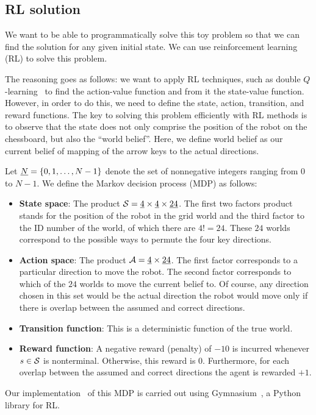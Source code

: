 \subsection{RL solution}
\label{ssec:rl_sol}
%
We want to be able to programmatically solve this toy problem so that we can 
find the solution for any given initial state. We can use reinforcement learning
(RL) to solve this problem. 

The reasoning goes as follows: we want to apply RL techniques, such as double
$Q$-learning~\cite{morales2020grokking} to find the action-value function and
from it the state-value function. However, in order to do this, we need to
define the state, action, transition, and reward functions. The key to solving 
this problem efficiently with RL methods is to observe that the state does not 
only comprise the position of the robot on the chessboard, but also the ``world 
belief''. Here, we define world belief as our current belief of mapping of the 
arrow keys to the actual directions.

Let $\uline{N} = \{0, 1, \ldots, N-1\}$ denote the set of nonnegative integers
ranging from $0$ to $N-1$. We define the Markov decision process (MDP) as
follows:

\begin{itemize}
\item \textbf{State space}: The product $\mc{S} = \uline{4} \times \uline{4}
\times \uline{24}$. The first two factors product stands for the position of the
robot in the grid world and the third factor to the ID number of the world, of
which there are $4! = 24$. These $24$ worlds correspond to the possible ways to
permute the four key directions.
\item \textbf{Action space}: The product $\mc{A} = \uline{4} \times \uline{24}$.
The first factor corresponds to a particular direction to move the robot. The
second factor corresponds to which of the $24$ worlds to move the current belief
to. Of course, any direction chosen in this set would be the actual direction
the robot would move only if there is overlap between the assumed and correct 
directions.
\item \textbf{Transition function}: This is a deterministic function of the true
world. 
\item \textbf{Reward function}: A negative reward (penalty) of $-10$ is
incurred whenever $s \in \mathcal{S}$ is nonterminal. Otherwise, this reward is $0$.
Furthermore, for each overlap between the assumed and correct directions
the agent is rewarded $+1$.
\end{itemize}

Our implementation~\cite{saticiGitHub} of this MDP is carried out using 
Gymnasium~\cite{towers2024gymnasium}, a Python library for RL.